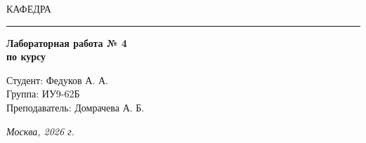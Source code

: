 \begin{titlepage}
  \vspace{0.5ex}
  \hspace{-35pt} \noindent \small КАФЕДРА\hspace{50pt} 

  \vspace*{-16pt}
  \hspace{30pt}\rule{0.866\textwidth}{0.4pt}

  \vspace{11em}

  \begin{center}
    \Large {\bf Лабораторная работа № 4} \\
    \large {\bf по курсу } \\
    \large {}

  \end{center}\normalsize

  \vspace{8em}

  \begin{flushright}
    \begin{minipage}{0.5\linewidth}
      {Студент: Федуков А. А. \hspace*{15pt}\\
        Группа: ИУ9-62Б \\
        Преподаватель: Домрачева А. Б.\hspace*{15pt}}
    \end{minipage}
  \end{flushright}
  \bigskip
  \vfill

  \begin{center}
    \textsl{Москва, 2026 г.}
  \end{center}
\end{titlepage}

